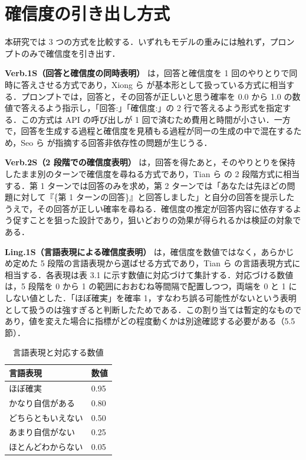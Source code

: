 \section{確信度の引き出し方式}

本研究では 3 つの方式を比較する．いずれもモデルの重みには触れず，プロンプトのみで確信度を引き出す．

\textbf{Verb.1S（回答と確信度の同時表明）} は，回答と確信度を 1 回のやりとりで同時に答えさせる方式であり，Xiong ら \cite{xiong2024llmuncertainty} が基本形として扱っている方式に相当する．プロンプトでは，回答と，その回答が正しいと思う確率を 0.0 から 1.0 の数値で答えるよう指示し，「回答:」「確信度:」の 2 行で答えるよう形式を指定する．この方式は API の呼び出しが 1 回で済むため費用と時間が小さい．一方で，回答を生成する過程と確信度を見積もる過程が同一の生成の中で混在するため，Seo ら \cite{seo2025advice}が指摘する回答非依存性の問題が生じうる．

\textbf{Verb.2S（2 段階での確信度表明）} は，回答を得たあと，そのやりとりを保持したまま別のターンで確信度を尋ねる方式であり，Tian ら \cite{tian2023justask} の 2 段階方式に相当する．第 1 ターンでは回答のみを求め，第 2 ターンでは「あなたは先ほどの問題に対して『\{第 1 ターンの回答\}』と回答しました」と自分の回答を提示したうえで，その回答が正しい確率を尋ねる．確信度の推定が回答内容に依存するよう促すことを狙った設計であり，狙いどおりの効果が得られるかは検証の対象である．

\textbf{Ling.1S（言語表現による確信度表明）} は，確信度を数値ではなく，あらかじめ定めた 5 段階の言語表現から選ばせる方式であり，Tian ら \cite{tian2023justask} の言語表現方式に相当する．各表現は表 3.1 に示す数値に対応づけて集計する．対応づける数値は，5 段階を 0 から 1 の範囲におおむね等間隔で配置しつつ，両端を 0 と 1 にしない値とした．「ほぼ確実」を確率 1，すなわち誤る可能性がないという表明として扱うのは強すぎると判断したためである．この割り当ては暫定的なものであり，値を変えた場合に指標がどの程度動くかは別途確認する必要がある（5.5 節）．

\begin{table}[htbp]
\centering
\small
\caption{言語表現と対応する数値}
\label{tab:3.1}
\begin{tabular}{|l|l|}
\hline
言語表現 & 数値 \\
\hline
ほぼ確実 & 0.95 \\
かなり自信がある & 0.80 \\
どちらともいえない & 0.50 \\
あまり自信がない & 0.25 \\
ほとんどわからない & 0.05 \\
\hline
\end{tabular}
\end{table}

